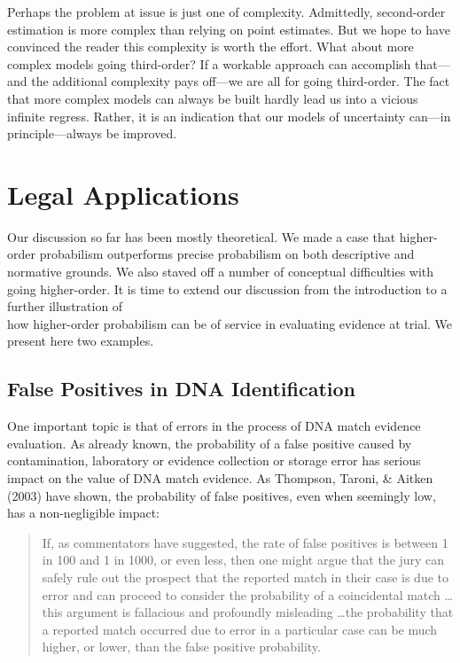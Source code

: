 \documentclass[
  10pt,
  dvipsnames,enabledeprecatedfontcommands]{scrartcl}
\newcommand{\inbook}[1]{\todo[color=gray!40]{#1}}
\begin{document}
Perhaps the problem at issue is just one of complexity. Admittedly,
second-order estimation is more complex than relying on point estimates.
But we hope to have convinced the reader this complexity is worth the
effort. What about more complex models going third-order? If a workable
approach can accomplish that---and the additional complexity pays
off---we are all for going third-order. The fact that more complex
models can always be built hardly lead us into a vicious infinite
regress. Rather, it is an indication that our models of uncertainty
can---in principle---always be improved.

\hypertarget{legal-applications}{%
\section{Legal Applications}\label{legal-applications}}

\label{sec:legal-applications}

\inbook{Add carpet evidence in the Wayne Williams case}

Our discussion so far has been mostly theoretical. We made a case that
higher-order probabilism outperforms precise probabilism on both
descriptive and normative grounds. We also staved off a number of
conceptual difficulties with going higher-order. It is time to extend
our discussion from the introduction to a further illustration of\\
how higher-order probabilism can be of service in evaluating evidence at
trial. We present here two examples.

\hypertarget{false-positives-in-dna-identification}{%
\subsection{False Positives in DNA
Identification}\label{false-positives-in-dna-identification}}

One important topic is that of errors in the process of DNA match
evidence evaluation. As already known, the probability of a false
positive caused by contamination, laboratory or evidence collection or
storage error has serious impact on the value of DNA match evidence. As
Thompson, Taroni, \& Aitken (2003) have shown, the probability of false
positives, even when seemingly low, has a non-negligible impact:

\begin{quote}
If, as commentators have suggested, the rate of false positives is between 1 in 100 and 1 in 1000, or even less, then one might argue that the jury can safely rule out
the prospect that the reported match in their case is due to error and can proceed to consider the probability of a coincidental match \dots this argument is fallacious and profoundly misleading \dots  the probability that a reported match occurred due to error in a particular case can be much higher, or lower, than the false positive probability. 
\end{quote}
\end{document}
